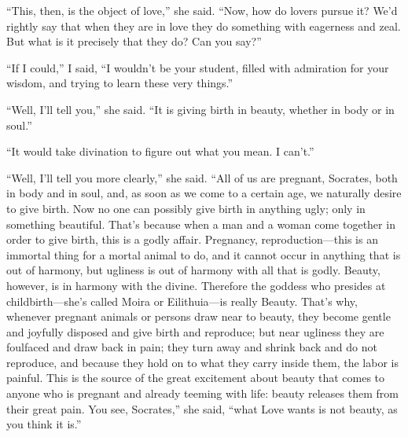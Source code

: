 “This, then, is the object of
love,” she said.
“Now, how do lovers pursue it? We’d rightly say that when they are in
love they do something with eagerness and zeal. But what is it precisely
that they do? Can you say?”

“If I could,” I said, “I wouldn’t be your student, filled with
admiration for your wisdom, and trying to learn these very things.”

“Well, I’ll tell you,” she said. “It is giving birth in
beauty, whether in
body or in soul.”

“It would take divination to figure out what you mean. I can’t.” 

“Well, I’ll tell you more clearly,” she said. “All of us are pregnant,
Socrates, both in body and in soul, and, as soon as we come to a certain
age, we naturally desire to give birth. Now no one can possibly give
birth in anything ugly; only in something beautiful. That’s because when
a man and a woman come together in order to give birth, this is a godly
affair. Pregnancy, reproduction---this is an immortal thing for a mortal
animal to do, and it cannot occur in anything that is out of harmony,
but ugliness  is out of harmony with all that is godly. Beauty,
however, is in harmony with the divine. Therefore the goddess who
presides at childbirth---she’s called Moira or Eilithuia---is really
Beauty. That’s why,
whenever pregnant animals or persons draw near to beauty, they become
gentle and joyfully disposed and give birth and reproduce; but near
ugliness they are foulfaced and draw back in pain; they turn away and
shrink back and do not reproduce, and because they hold on to what they
carry inside them, the labor is painful. This is the source of the great
excitement about beauty  that comes to anyone who is pregnant and
already teeming with life: beauty releases them from their great pain.
You see, Socrates,” she said, “what Love wants is not beauty, as you
think it is.”

